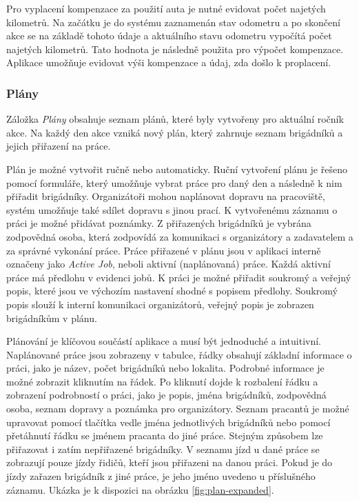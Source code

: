 Pro vyplacení kompenzace za použití auta je nutné evidovat počet najetých kilometrů. Na začátku je do systému zaznamenán stav odometru a po skončení akce
se na základě tohoto údaje a aktuálního stavu odometru vypočítá počet najetých kilometrů. Tato hodnota je následně použita pro výpočet kompenzace. Aplikace 
umožňuje evidovat výši kompenzace a údaj, zda došlo k proplacení.

\subsubsection{Plány}

Záložka \textit{Plány} obsahuje seznam plánů, které byly vytvořeny pro aktuální ročník akce. Na každý den akce vzniká nový plán, který zahrnuje
seznam brigádníků a jejich přiřazení na práce.

Plán je možné vytvořit ručně nebo automaticky. Ruční vytvoření plánu je řešeno pomocí formuláře, který umožňuje vybrat práce pro daný den a následně 
k nim přiřadit brigádníky. Organizátoři mohou naplánovat dopravu na pracoviště, systém umožňuje také sdílet dopravu s jinou prací. K vytvořenému záznamu
o práci je možné přidávat poznámky. Z přiřazených brigádníků je vybrána zodpovědná osoba, která zodpovídá za komunikaci s organizátory a zadavatelem a za správné vykonání práce.
Práce přiřazené v plánu jsou v aplikaci interně označeny jako \textit{Active Job}, neboli aktivní (naplánovaná) práce. Každá aktivní práce má předlohu v evidenci jobů.
K práci je možné přiřadit soukromý a veřejný popis, které jsou ve výchozím nastavení shodné s popisem předlohy. Soukromý popis slouží k interní komunikaci organizátorů,
veřejný popis je zobrazen brigádníkům v plánu.

Plánování je klíčovou součástí aplikace a musí být jednoduché a intuitivní. Naplánované práce jsou zobrazeny v tabulce, řádky obsahují
základní informace o práci, jako je název, počet brigádníků nebo lokalita. Podrobné informace je možné zobrazit kliknutím na řádek. Po kliknutí 
dojde k rozbalení řádku a zobrazení podrobností o práci, jako je popis, jména brigádníků, zodpovědná osoba, seznam dopravy a poznámka pro organizátory.
Seznam pracantů je možné upravovat pomocí tlačítka vedle jména jednotlivých brigádníků nebo pomocí přetáhnutí řádku se jménem pracanta do jiné práce.
Stejným způsobem lze přiřazovat i zatím nepřiřazené brigádníky. V seznamu jízd u dané práce se zobrazují pouze jízdy řidičů, kteří jsou přiřazeni na danou práci.
Pokud je do jízdy zařazen brigádník z jiné práce, je jeho jméno uvedeno u příslušného záznamu. Ukázka je k dispozici na obrázku \ref{fig:plan-expanded}.

